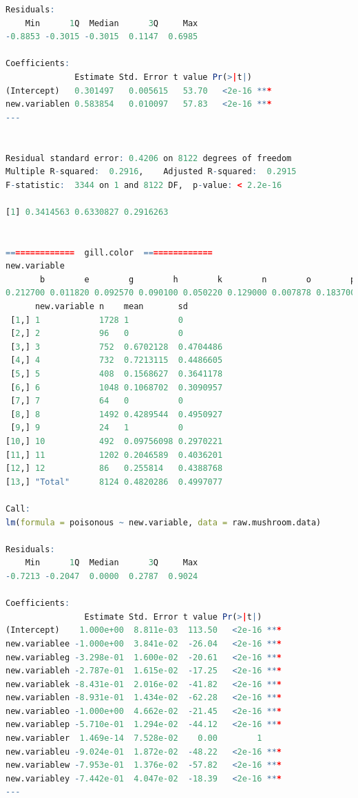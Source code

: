 \documentclass[12pt]{article}
\begin{document}
\begin{lstlisting}[language = R]
Residuals:
    Min      1Q  Median      3Q     Max 
-0.8853 -0.3015 -0.3015  0.1147  0.6985 

Coefficients:
              Estimate Std. Error t value Pr(>|t|)    
(Intercept)   0.301497   0.005615   53.70   <2e-16 ***
new.variablen 0.583854   0.010097   57.83   <2e-16 ***
---


Residual standard error: 0.4206 on 8122 degrees of freedom
Multiple R-squared:  0.2916,	Adjusted R-squared:  0.2915 
F-statistic:  3344 on 1 and 8122 DF,  p-value: < 2.2e-16

[1] 0.3414563 0.6330827 0.2916263


==============  gill.color  ==============
new.variable
       b        e        g        h        k        n        o        p        r        u        w        y     <NA> 
0.212700 0.011820 0.092570 0.090100 0.050220 0.129000 0.007878 0.183700 0.002954 0.060560 0.148000 0.010590 0.000000 
      new.variable n    mean       sd       
 [1,] 1            1728 1          0        
 [2,] 2            96   0          0        
 [3,] 3            752  0.6702128  0.4704486
 [4,] 4            732  0.7213115  0.4486605
 [5,] 5            408  0.1568627  0.3641178
 [6,] 6            1048 0.1068702  0.3090957
 [7,] 7            64   0          0        
 [8,] 8            1492 0.4289544  0.4950927
 [9,] 9            24   1          0        
[10,] 10           492  0.09756098 0.2970221
[11,] 11           1202 0.2046589  0.4036201
[12,] 12           86   0.255814   0.4388768
[13,] "Total"      8124 0.4820286  0.4997077

Call:
lm(formula = poisonous ~ new.variable, data = raw.mushroom.data)

Residuals:
    Min      1Q  Median      3Q     Max 
-0.7213 -0.2047  0.0000  0.2787  0.9024 

Coefficients:
                Estimate Std. Error t value Pr(>|t|)    
(Intercept)    1.000e+00  8.811e-03  113.50   <2e-16 ***
new.variablee -1.000e+00  3.841e-02  -26.04   <2e-16 ***
new.variableg -3.298e-01  1.600e-02  -20.61   <2e-16 ***
new.variableh -2.787e-01  1.615e-02  -17.25   <2e-16 ***
new.variablek -8.431e-01  2.016e-02  -41.82   <2e-16 ***
new.variablen -8.931e-01  1.434e-02  -62.28   <2e-16 ***
new.variableo -1.000e+00  4.662e-02  -21.45   <2e-16 ***
new.variablep -5.710e-01  1.294e-02  -44.12   <2e-16 ***
new.variabler  1.469e-14  7.528e-02    0.00        1    
new.variableu -9.024e-01  1.872e-02  -48.22   <2e-16 ***
new.variablew -7.953e-01  1.376e-02  -57.82   <2e-16 ***
new.variabley -7.442e-01  4.047e-02  -18.39   <2e-16 ***
---



\end{lstlisting}
\end{document}
